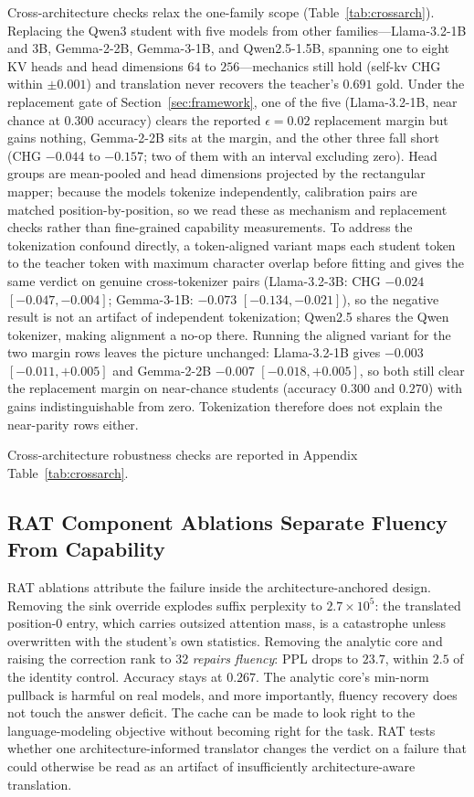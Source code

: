 \documentclass{article} %
\begin{document}
Cross-architecture checks relax the one-family scope
(Table~\ref{tab:crossarch}). Replacing the Qwen3 student with five models from
other families---Llama-3.2-1B and 3B, Gemma-2-2B, Gemma-3-1B, and
Qwen2.5-1.5B, spanning one to eight KV heads and head dimensions $64$ to
$256$---mechanics still hold (self-kv CHG within $\pm0.001$) and translation
never recovers the teacher's $0.691$ gold. Under the replacement gate of
Section~\ref{sec:framework}, one of the five (Llama-3.2-1B, near chance at
$0.300$ accuracy) clears the reported $\epsilon{=}0.02$ replacement margin but gains nothing, Gemma-2-2B sits at the
margin, and the other three fall short (CHG $-0.044$ to $-0.157$; two of them
with an interval excluding zero). Head groups are mean-pooled and head
dimensions projected by the rectangular mapper; because the models tokenize
independently, calibration pairs are matched position-by-position, so we read
these as mechanism and replacement checks rather than fine-grained capability
measurements. To address the tokenization confound directly, a token-aligned
variant maps each student token to the teacher token with maximum character
overlap before fitting and gives the same verdict on genuine cross-tokenizer
pairs (Llama-3.2-3B: CHG $-0.024$ $[-0.047,-0.004]$; Gemma-3-1B: $-0.073$
$[-0.134,-0.021]$), so the negative result is not an artifact of independent
tokenization; Qwen2.5 shares the Qwen tokenizer, making alignment a no-op
there. Running the aligned variant for the two margin rows leaves the picture
unchanged: Llama-3.2-1B gives $-0.003$ $[-0.011,+0.005]$ and Gemma-2-2B
$-0.007$ $[-0.018,+0.005]$, so both still clear the replacement margin on
near-chance students (accuracy $0.300$ and $0.270$) with gains indistinguishable
from zero. Tokenization therefore does not explain the near-parity rows either.

Cross-architecture robustness checks are reported in
Appendix Table~\ref{tab:crossarch}.


\subsection{RAT Component Ablations Separate Fluency From Capability}
\label{sec:ratresults}
RAT ablations attribute the failure inside the architecture-anchored design.
Removing the sink override explodes suffix perplexity to $2.7\times10^{5}$:
the translated position-0 entry, which carries outsized attention mass, is a
catastrophe unless overwritten with the student's own statistics. Removing
the analytic core and raising the correction rank to 32 \emph{repairs
fluency}: PPL drops to $23.7$, within $2.5$ of the identity control. Accuracy
stays at $0.267$. The analytic core's min-norm pullback is harmful on real
models, and more importantly, fluency recovery does not touch the answer
deficit. The cache can be made to look right to the language-modeling
objective without becoming right for the task. RAT tests whether one
architecture-informed translator changes the verdict on a failure that could
otherwise be read as an artifact of insufficiently architecture-aware
translation.
\end{document}
